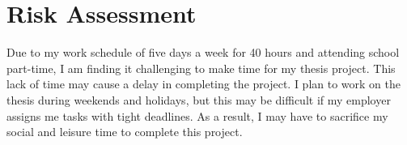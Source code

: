 \section{Risk Assessment}
\label{sec:risk_assessment}

Due to my work schedule of five days a week for 40 hours and attending school part-time, I am finding it challenging to make time for my thesis project. This lack of time may cause a delay in completing the project. I plan to work on the thesis during weekends and holidays, but this may be difficult if my employer assigns me tasks with tight deadlines. As a result, I may have to sacrifice my social and leisure time to complete this project.